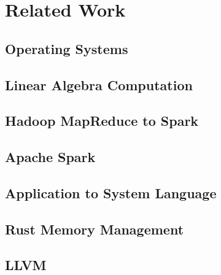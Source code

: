 \chapter{Related Work}
\label{chapter:relatedwork}
\thispagestyle{myheadings}

\graphicspath{{2_RelatedWork/Figures/}}

\section{Operating Systems}
\label{sec:os}


\section{Linear Algebra Computation}
\label{sec:linalg}


\section{Hadoop MapReduce to Spark}
\label{sec:hadoopspark}


\section{Apache Spark}
\label{sec:spark}


\section{Application to System Language}
\label{sec:appsys}


\section{Rust Memory Management}
\label{sec:rustmem}


\section{LLVM}
\label{sec:llvm}


% 


% 

\clearpage



